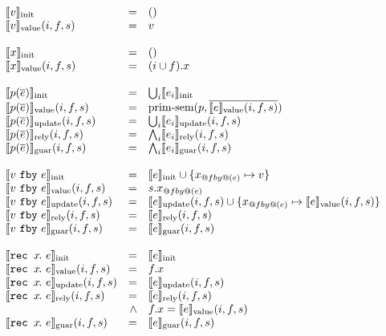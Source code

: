 \begin{figure}
  \small
  \[
  \begin{array}{lrl}
    \sysinit{v} & = & () \\
    \sysvalue{v}(i, f, s) & = & v \\
    \\
    \sysinit{x} & = & () \\
    \sysvalue{x}(i, f, s) & = & (i \cup f).x \\
    \\
    \sysinit{p(\ov{e})} & = & \bigcup_i \sysinit{e_i} \\
    \sysvalue{p(\ov{e})}(i, f, s) & = & \text{prim-sem}(p, \ov{\sysvalue{e}(i, f, s)}) \\
    \sysupdate{p(\ov{e})}(i, f, s) & = & \bigcup_i \sysupdate{e_i}(i, f, s) \\
    \sysrely{p(\ov{e})}(i, f, s) & = & \bigwedge_i \sysrely{e_i}(i, f, s) \\
    \sysguar{p(\ov{e})}(i, f, s) & = & \bigwedge_i \sysguar{e_i}(i, f, s) \\
    \\
    \sysinit{\xfby{v}{e}} & = & \sysinit{e} \cup \{ x_{@fby@(e)} \mapsto v \} \\
    \sysvalue{\xfby{v}{e}}(i, f, s) & = & s.x_{@fby@(e)} \\
    \sysupdate{\xfby{v}{e}}(i, f, s) & = & \sysupdate{e}(i, f, s) \cup \{x_{@fby@(e)} \mapsto \sysvalue{e}(i, f, s)\}\\
    \sysrely{\xfby{v}{e}}(i, f, s) & = & \sysrely{e}(i, f, s) \\
    \sysguar{\xfby{v}{e}}(i, f, s) & = & \sysguar{e}(i, f, s) \\
    \\
    \sysinit{\xrec{x}{e}} & = & \sysinit{e} \\
    \sysvalue{\xrec{x}{e}}(i, f, s) & = & f.x \\
    \sysupdate{\xrec{x}{e}}(i, f, s) & = & \sysupdate{e}(i, f, s)\\
    \sysrely{\xrec{x}{e}}(i, f, s) & = & \sysrely{e}(i, f, s) \\
          & \wedge & f.x = \sysvalue{e}(i, f, s) \\
    \sysguar{\xrec{x}{e}}(i, f, s) & = & \sysguar{e}(i, f, s) \\

\end{array}\]
\end{figure}
